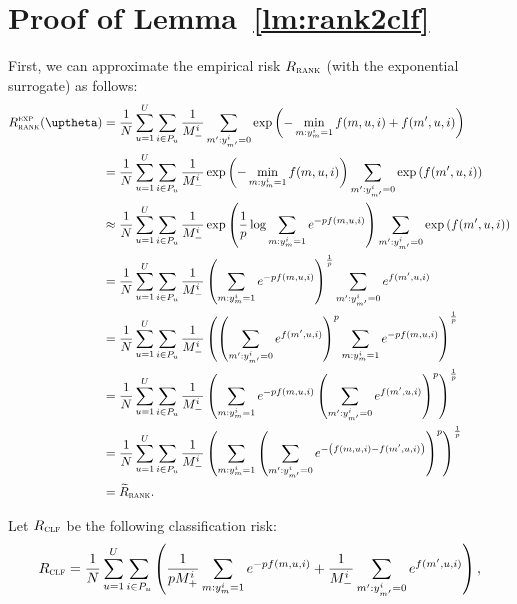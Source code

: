 \section{Proof of Lemma~\ref{lm:rank2clf}}

First, we can approximate the empirical risk $R_\textsc{rank}$ (with the exponential surrogate) as follows:
\begin{equation*}
\begin{aligned}
R_\textsc{rank}^\textsc{exp}(\uptheta)
&= \frac{1}{N} \sum_{u=1}^U \sum_{i \in P_u} \frac{1}{M_-^i} \sum_{m': y_{m'}^i = 0} \exp \left( -\min_{m: y_m^i = 1} f(m, u, i) + f(m', u, i) \right) \\
&= \frac{1}{N} \sum_{u=1}^U \sum_{i \in P_u} \frac{1}{M_-^i} \exp \left( -\min_{m: y_m^i = 1} f(m, u, i) \right) 
   \sum_{m': y_{m'}^i = 0} \exp \left( f(m', u, i) \right) \\
&\approx \frac{1}{N} \sum_{u=1}^U \sum_{i \in P_u} \frac{1}{M_-^i} \exp \left( \frac{1}{p} \log \sum_{m: y_m^i = 1} e^{-p f(m, u, i)} \right)
   \sum_{m': y_{m'}^i = 0} \exp \left( f(m', u, i) \right) \\
&= \frac{1}{N} \sum_{u=1}^U \sum_{i \in P_u} \frac{1}{M_-^i} \left( \sum_{m: y_m^i = 1} e^{-p f(m, u, i)} \right)^\frac{1}{p} 
   \sum_{m': y_{m'}^i = 0} e^{f(m', u, i)} \\
&= \frac{1}{N} \sum_{u=1}^U \sum_{i \in P_u} \frac{1}{M_-^i} \left( \left( \sum_{m': y_{m'}^i = 0} e^{f(m', u, i)} \right)^p 
   \sum_{m: y_m^i = 1} e^{-p f(m, u, i)} \right)^\frac{1}{p} \\
&= \frac{1}{N} \sum_{u=1}^U \sum_{i \in P_u} \frac{1}{M_-^i} \left( 
   \sum_{m: y_m^i = 1} e^{-p f(m, u, i)} \left( \sum_{m': y_{m'}^i = 0} e^{f(m', u, i)} \right)^p \right)^\frac{1}{p} \\
&= \frac{1}{N} \sum_{u=1}^U \sum_{i \in P_u} \frac{1}{M_-^i} \left( 
   \sum_{m: y_m^i = 1} \left( \sum_{m': y_{m'}^i = 0} e^{- \left( f(m, u, i) - f(m', u, i) \right)} \right)^p \right)^\frac{1}{p} \\
&= \widetilde R_\textsc{rank}.
\end{aligned}
\end{equation*}

Let $R_\textsc{clf}$ be the following classification risk:
\begin{equation*}
R_\textsc{clf} 
= \frac{1}{N} \sum_{u=1}^U \sum_{i \in P_u} \left( 
  \frac{1}{p M_+^i} \sum_{m: y_m^i = 1} e^{-p f(m, u, i)} 
  + \frac{1}{M_-^i} \sum_{m': y_{m'}^i = 0} e^{f(m', u, i)} \right),
\end{equation*}

